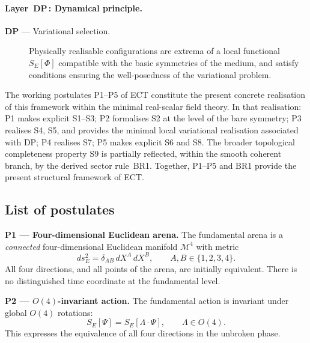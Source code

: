 \documentclass[11pt,a4paper]{article}
\numberwithin{equation}{section}
\begin{document}
\paragraph{Layer~DP\,: Dynamical principle.}

\begin{description}
  \item[\textbf{DP} --- Variational selection.]
    Physically realisable configurations are extrema of a local
    functional $S_E[\Phi]$ compatible with the basic symmetries of the
    medium, and satisfy conditions ensuring the well-posedness of the
    variational problem.
\end{description}

\medskip
The working postulates P1--P5 of ECT constitute the present concrete
realisation of this framework within the minimal real-scalar field theory.
In that realisation:
P1 makes explicit S1--S3;
P2 formalises S2 at the level of the bare symmetry;
P3 realises S4, S5, and provides the minimal local variational
realisation associated with DP;
P4 realises S7;
P5 makes explicit S6 and S8.
The broader topological completeness property S9 is partially reflected,
within the smooth coherent branch, by the derived sector rule~BR1.
Together, P1--P5 and BR1 provide the present structural framework of ECT.

\subsection{List of postulates}
\label{subsec:postulate_list}

\medskip
\noindent\textbf{P1 --- Four-dimensional Euclidean arena.}
The fundamental arena is a \emph{connected} four-dimensional Euclidean manifold
$\mathcal{M}^4$ with metric
\begin{equation}
  \label{eq:P1_metric}
  ds^2_E = \delta_{AB}\,dX^A\,dX^B,\qquad A,B\in\{1,2,3,4\}.
\end{equation}
All four directions, and all points of the arena, are initially equivalent.
There is no distinguished time coordinate at the fundamental level.

\medskip
\noindent\textbf{P2 --- $O(4)$-invariant action.}
The fundamental action is invariant under global $O(4)$ rotations:
\begin{equation}
  \label{eq:P2_symmetry}
  S_E[\Psi] = S_E[\Lambda\cdot\Psi], \qquad \Lambda\in O(4).
\end{equation}
This expresses the equivalence of all four directions in the
unbroken phase.
\end{document}
